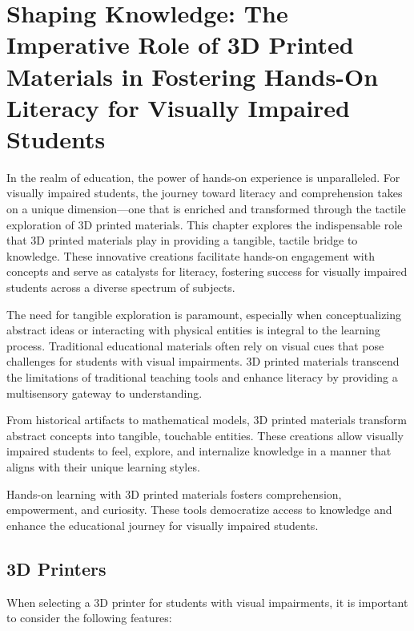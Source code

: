 \chapter{Shaping Knowledge: The Imperative Role of 3D Printed Materials in Fostering Hands-On Literacy for Visually Impaired Students}\label{d-printers}

In the realm of education, the power of hands-on experience is unparalleled. For visually impaired students, the journey toward literacy and comprehension takes on a unique dimension—one that is enriched and transformed through the tactile exploration of 3D printed materials. This chapter explores the indispensable role that 3D printed materials play in providing a tangible, tactile bridge to knowledge. These innovative creations facilitate hands-on engagement with concepts and serve as catalysts for literacy, fostering success for visually impaired students across a diverse spectrum of subjects.

The need for tangible exploration is paramount, especially when conceptualizing abstract ideas or interacting with physical entities is integral to the learning process. Traditional educational materials often rely on visual cues that pose challenges for students with visual impairments. 3D printed materials transcend the limitations of traditional teaching tools and enhance literacy by providing a multisensory gateway to understanding.

From historical artifacts to mathematical models, 3D printed materials transform abstract concepts into tangible, touchable entities. These creations allow visually impaired students to feel, explore, and internalize knowledge in a manner that aligns with their unique learning styles.

Hands-on learning with 3D printed materials fosters comprehension, empowerment, and curiosity. These tools democratize access to knowledge and enhance the educational journey for visually impaired students.

\section{3D Printers}\label{d-print-equipment}
When selecting a 3D printer for students with visual impairments, it is important to consider the following features:

